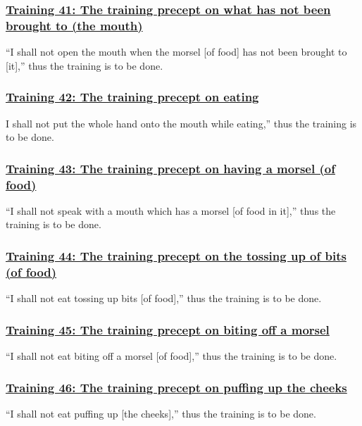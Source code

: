 \subsubsection*{\hyperref[sekh41]{Training 41: The training precept on what has not been brought to (the mouth)}}
\label{training41}
``I shall not open the mouth when the morsel [of food] has not been brought to [it],'' thus the training is to be done.

\subsubsection*{\hyperref[sekh42]{Training 42: The training precept on eating}}
\label{training42}
I shall not put the whole hand onto the mouth while eating,'' thus the training is to be done.

\subsubsection*{\hyperref[sekh43]{Training 43: The training precept on having a morsel (of food)}}
\label{training43}
``I shall not speak with a mouth which has a morsel [of food in it],'' thus the training is to be done.

\subsubsection*{\hyperref[sekh44]{Training 44: The training precept on the tossing up of bits (of food)}}
\label{training44}
``I shall not eat tossing up bits [of food],'' thus the training is to be done.

\subsubsection*{\hyperref[sekh45]{Training 45: The training precept on biting off a morsel}}
\label{training45}
``I shall not eat biting off a morsel [of food],'' thus the training is to be done.

\subsubsection*{\hyperref[sekh46]{Training 46: The training precept on puffing up the cheeks}}
\label{training46}
``I shall not eat puffing up [the cheeks],'' thus the training is to be done.

